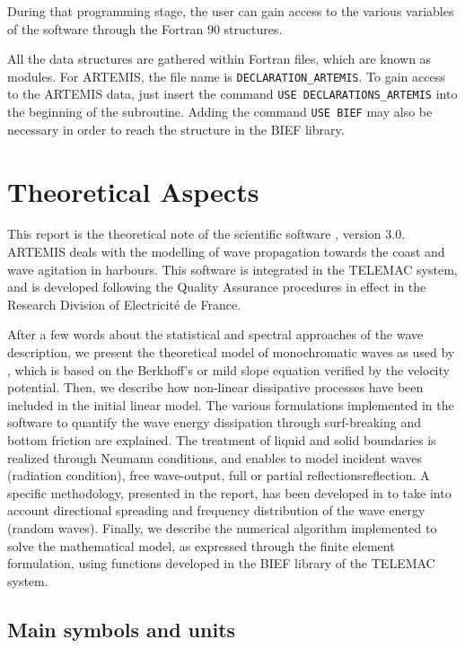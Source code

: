 During that programming stage, the user can gain access to the various
variables of the software through the Fortran 90 structures.

All the data structures are gathered within Fortran files, which are known as
modules. For ARTEMIS, the file name is
\verb!DECLARATION_ARTEMIS!. To gain access to the ARTEMIS data,
just insert the command \verb!USE DECLARATIONS_ARTEMIS! into
the beginning of the subroutine. Adding the command \verb!USE BIEF! may also
be necessary in order to reach the structure in the BIEF library.

\chapter{Theoretical Aspects}

This report is the theoretical note of the scientific software \artemis{},
version 3.0. ARTEMIS deals with the modelling of wave propagation towards the
coast and wave agitation in harbours. This software is integrated in the
TELEMAC system, and is developed following the Quality Assurance procedures in
effect in the Research Division of Electricit\'{e} de France.

After a few words about the statistical and spectral approaches of the wave
description, we present the theoretical model of monochromatic waves as used by
\artemis{}, which is based on the Berkhoff's or mild slope equation verified by
the velocity potential. Then, we describe how non-linear dissipative processes
have been included in the initial linear model. The various formulations
implemented in the software to quantify the wave energy dissipation through
surf-breaking and bottom friction are explained. The treatment of liquid and
solid boundaries is realized through Neumann conditions, and enables to model
incident waves (radiation condition), free wave-output, full or partial
reflectionsreflection. A specific methodology, presented in the report, has
been developed in \artemis{} to take into account directional spreading and
frequency distribution of the wave energy (random waves). Finally, we describe
the numerical algorithm implemented to solve the mathematical model, as
expressed through the finite element formulation, using functions developed in
the BIEF library of the TELEMAC system.


\section{Main symbols and units}



